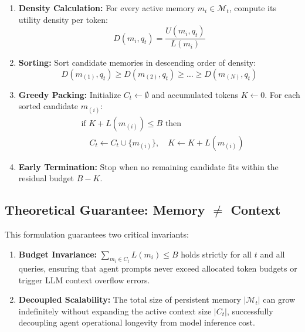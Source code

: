 \begin{enumerate}
    \item \textbf{Density Calculation:} For every active memory $m_i \in \mathcal{M}_t$, compute its utility density per token:
    \begin{equation}
    D(m_i, q_t) = \frac{U(m_i, q_t)}{L(m_i)}
    \end{equation}
    \item \textbf{Sorting:} Sort candidate memories in descending order of density:
    \begin{equation}
    D(m_{(1)}, q_t) \ge D(m_{(2)}, q_t) \ge \dots \ge D(m_{(N)}, q_t)
    \end{equation}
    \item \textbf{Greedy Packing:} Initialize $C_t \leftarrow \emptyset$ and accumulated tokens $K \leftarrow 0$. For each sorted candidate $m_{(i)}$:
    \begin{equation}
    \begin{aligned}
    &\text{if } K + L(m_{(i)}) \le B\text{ then} \\
    &\quad C_t \leftarrow C_t \cup \{m_{(i)}\}, \quad K \leftarrow K + L(m_{(i)})
    \end{aligned}
    \end{equation}
    \item \textbf{Early Termination:} Stop when no remaining candidate fits within the residual budget $B - K$.
\end{enumerate}

\subsection{Theoretical Guarantee: Memory $\ne$ Context}
This formulation guarantees two critical invariants:
\begin{enumerate}
    \item \textbf{Budget Invariance:} $\sum_{m_i \in C_t} L(m_i) \le B$ holds strictly for all $t$ and all queries, ensuring that agent prompts never exceed allocated token budgets or trigger LLM context overflow errors.
    \item \textbf{Decoupled Scalability:} The total size of persistent memory $|\mathcal{M}_t|$ can grow indefinitely without expanding the active context size $|C_t|$, successfully decoupling agent operational longevity from model inference cost.
\end{enumerate}
